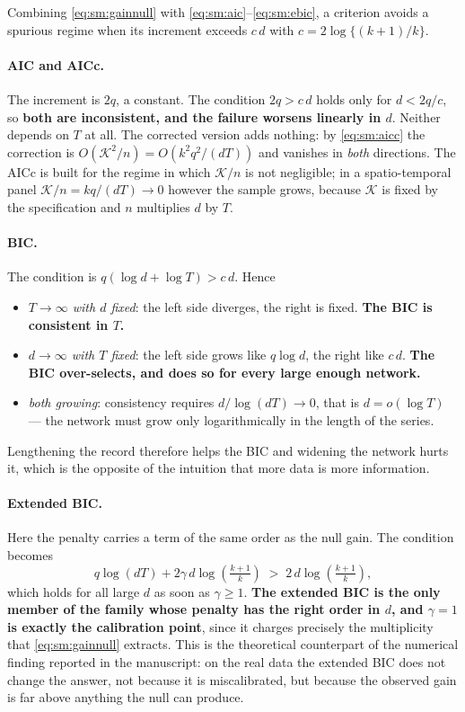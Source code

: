 \documentclass[11pt]{article}
\begin{document}
Combining \eqref{eq:sm:gainnull} with \eqref{eq:sm:aic}--\eqref{eq:sm:ebic}, a criterion avoids a spurious regime when its increment exceeds $c\,d$ with $c = 2\log\{(k+1)/k\}$.

\paragraph{AIC and AICc.} The increment is $2q$, a constant. The condition $2q > c\,d$ holds only for $d < 2q/c$, so \textbf{both are inconsistent, and the failure worsens linearly in $d$}. Neither depends on $T$ at all. The corrected version adds nothing: by \eqref{eq:sm:aicc} the correction is $O(\mathcal{K}^2/n) = O(k^2q^2/(dT))$ and vanishes in \emph{both} directions. The AICc is built for the regime in which $\mathcal{K}/n$ is not negligible; in a spatio-temporal panel $\mathcal{K}/n = kq/(dT) \to 0$ however the sample grows, because $\mathcal{K}$ is fixed by the specification and $n$ multiplies $d$ by $T$.

\paragraph{BIC.} The condition is $q(\log d + \log T) > c\,d$. Hence
\begin{itemize}[leftmargin=1.4em,itemsep=2pt,topsep=3pt]
  \item \emph{$T \to \infty$ with $d$ fixed}: the left side diverges, the right is fixed. \textbf{The BIC is consistent in $T$.}
  \item \emph{$d \to \infty$ with $T$ fixed}: the left side grows like $q\log d$, the right like $c\,d$. \textbf{The BIC over-selects, and does so for every large enough network.}
  \item \emph{both growing}: consistency requires $d / \log(dT) \to 0$, that is $d = o(\log T)$ --- the network must grow only logarithmically in the length of the series.
\end{itemize}
Lengthening the record therefore helps the BIC and widening the network hurts it, which is the opposite of the intuition that more data is more information.

\paragraph{Extended BIC.} Here the penalty carries a term of the same order as the null gain. The condition becomes
\[
  q\log(dT) + 2\gamma\, d \log\!\left(\tfrac{k+1}{k}\right) \;>\; 2\,d\log\!\left(\tfrac{k+1}{k}\right),
\]
which holds for all large $d$ as soon as $\gamma \ge 1$. \textbf{The extended BIC is the only member of the family whose penalty has the right order in $d$, and $\gamma = 1$ is exactly the calibration point}, since it charges precisely the multiplicity that \eqref{eq:sm:gainnull} extracts. This is the theoretical counterpart of the numerical finding reported in the manuscript: on the real data the extended BIC does not change the answer, not because it is miscalibrated, but because the observed gain is far above anything the null can produce.
\end{document}
